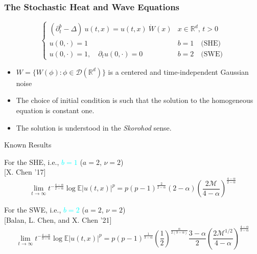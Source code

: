 \documentclass{beamer}%
\numberwithin{equation}{section}
\newcommand{\R}{\mathbb{R}}
\begin{document}
	
	\begin{frame}[t]%
		\frametitle{The Stochastic Heat and Wave Equations}
		
		\begin{equation*}
		\begin{cases}
		\left(\partial^b_t  -\Delta \right)\: u(t,x) =  u(t,x)\: \dot W(x) & \text{$x\in \R^d$, $t>0$} \\
		u(0,\cdot) = 1                                                     & b=1 \quad \text{(SHE)}    \\
		u(0,\cdot) = 1, \quad \partial_t u(0,\cdot) = 0                    & b=2 \quad \text{(SWE)}
		\end{cases}
		\end{equation*}
		
		\vfill
		\begin{itemize}
			\item $W = \{ W(\phi) : \phi \in \mathcal{D}(\R^d) \}$ is a centered and time-independent Gaussian noise
			\bigskip
			\item The choice of initial condition is such that the solution to the homogeneous equation is constant one.
			\bigskip
			\item The solution is understood in the {\it Skorohod} sense.
		\end{itemize}
		
	\end{frame}%
	\begin{frame}{Known Results}%
		\begin{center}
			For the SHE, i.e., \textcolor{cyan}{$b=1$} ($a=2$, $\nu=2$)\\
			{\small [X. Chen '17]}
			\[
			\lim_{t\to \infty}t^{-\frac{4-\alpha}{2-\alpha}}\log \mathbb{E}|u(t,x)|^p =p(p-1)^{\frac{2}{2-\alpha}} (2-\alpha)\left(\frac{2\mathcal{M}}{4-\alpha}\right)^{\frac{4-\alpha}{2-\alpha}}
			\]
		\end{center}
		\vspace{.3in}
		\begin{center}
			For the SWE, i.e., \textcolor{cyan}{$b=2$} ($a=2$, $\nu=2$)\\
			{\small [Balan, L. Chen, and X. Chen '21]}
			\[
			\lim_{t \to \infty} t^{-\frac{4-\alpha}{3-\alpha}} \log \mathbb{E}|u(t,x)|^p =p(p-1)^{\frac{1}{3-\alpha}} \left(\frac{1}{2}\right)^{\frac{\alpha}{2(3-\alpha)}} \frac{3- \alpha}{2} \left( \frac{2 \mathcal{M}^{1/2}}{4-\alpha} \right)^{\frac{4-\alpha}{3-\alpha}}
			\]
		\end{center}
		
	\end{frame}%
	
\end{document}
